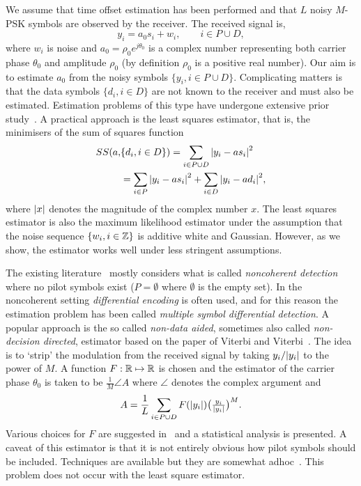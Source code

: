 \documentclass[journal]{IEEEtran}
\begin{document}
We assume that time offset estimation has been performed and that $L$ noisy $M$-PSK symbols are observed by the receiver.  The received signal is,
\begin{equation}\label{eq:sigmod}
y_i = a_0 s_i + w_i, \qquad i \in P \cup D,
\end{equation}
where $w_i$ is noise and $a_0 = \rho_0 e^{j\theta_0}$ is a complex number representing both carrier phase $\theta_0$ and amplitude $\rho_0$ (by definition $\rho_0$ is a positive real number).  Our aim is to estimate $a_0$ from the noisy symbols $\{ y_i, i \in P \cup D \}$.  Complicating matters is that the data symbols $\{d_i, i \in D\}$ are not known to the receiver and must also be estimated.  Estimation problems of this type have undergone extensive prior study~\cite{ViterbiViterbi_phase_est_1983,Cowley_ref_sym_carr_1998,Wilson1989,Makrakis1990,Liu1991,Mackenthun1994,Sweldens2001,McKilliamLinearTimeBlockPSK2009,Divsalar1990}.  A practical approach is the least squares estimator, that is, the minimisers of the sum of squares function
\begin{equation}\label{eq:SSdefn}
\begin{split}
SS(a, &\{d_i, i \in D\}) = \sum_{i \in P \cup D} {\left\vert  y_i - a s_i  \right\vert}^2  \\
&= \sum_{i \in P} {\left\vert  y_i - a s_i  \right\vert}^2 + \sum_{i \in D} {\left\vert  y_i - a d_i  \right\vert}^2,
\end{split}
\end{equation}
where ${\left\vert x \right\vert}$ denotes the magnitude of the complex number $x$.  The least squares estimator is also the maximum likelihood estimator under the assumption that the noise sequence $\{w_i, i \in {\mathbb Z}\}$ is additive white and Gaussian.  However, as we show, the estimator works well under less stringent assumptions.  %

The existing literature~\cite{Mackenthun1994,Cowley_ref_sym_carr_1998,ViterbiViterbi_phase_est_1983,Sweldens2001,Wilson1989,Makrakis1990,Liu1991} mostly considers what is called \emph{noncoherent detection} where no pilot symbols exist ($P = \emptyset$ where $\emptyset$ is the empty set).  In the noncoherent setting \emph{differential encoding} is often used, and for this reason the estimation problem has been called \emph{multiple symbol differential detection}.  A popular approach is the so called \emph{non-data aided}, sometimes also called \emph{non-decision directed}, estimator based on the paper of Viterbi and Viterbi~\cite{ViterbiViterbi_phase_est_1983}.  The idea is to `strip' the modulation from the received signal by taking $y_i / {\left\vert y_i \right\vert}$ to the power of $M$.  A function $F: {\mathbb R} \mapsto {\mathbb R}$ is chosen and the estimator of the carrier phase $\theta_0$ is taken to be $\tfrac{1}{M}\angle{A}$ where $\angle$ denotes the complex argument and
\[
A = \frac{1}{L}\sum_{i \in P \cup D} F({\left\vert y_i \right\vert}) \big(\tfrac{y_i}{{\left\vert y_i \right\vert}}\big)^M.
\]
Various choices for $F$ are suggested in~\cite{ViterbiViterbi_phase_est_1983} and a statistical analysis is presented.  A caveat of this estimator is that it is not entirely obvious how pilot symbols should be included. Techniques are available but they are somewhat adhoc~\cite{Cowley_ref_sym_carr_1998}.  This problem does not occur with the least square estimator.
\end{document}
